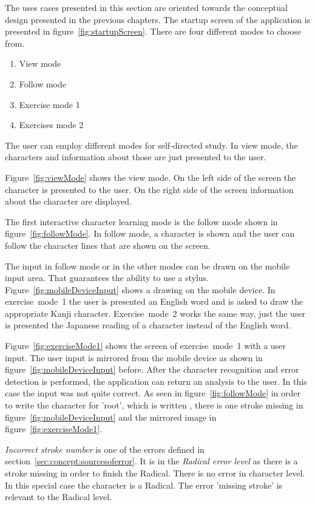 The uses cases presented in this section are oriented towards the conceptual
design presented in the previous chapters. The startup screen of the application
is presented in figure~\ref{fig:startupScreen}. There are four different modes 
to choose from.
\begin{enumerate}
\item View mode
\item Follow mode
\item Exercise mode 1
\item Exercises mode 2
\end{enumerate}
The user can employ different modes for self-directed study. In view mode,
the characters and information about those are just presented to the user.

Figure~\ref{fig:viewMode} shows the view mode. On the left side of the screen
the character is presented to the user. On the right side of the screen
information about the character are displayed.

The first interactive character learning mode is the follow mode shown in
figure~\ref{fig:followMode}. In follow mode, a character is shown and the user
can follow the character lines that are shown on the screen. 

The input in follow mode or in the other modes can be drawn on the mobile input
area. That guarantees the ability to use a stylus. 
Figure~\ref{fig:mobileDeviceInput} shows a drawing on the mobile device.
In exercise~mode~1 the user is presented an English word and is asked 
to draw the appropriate Kanji character. Exercise~mode~2 works the same way,
just the user is presented the Japanese reading of a character instead of the
English word.

Figure~\ref{fig:exerciseMode1} shows the screen of exercise~mode~1 with a
user input. The user input is mirrored from the mobile device as shown in 
figure~\ref{fig:mobileDeviceInput} before.
After the character recognition and error detection is performed,
the application can return an analysis to the user.
In this case the input was not quite correct. As seen in 
figure~\ref{fig:followMode} in order to write the character for 'root',
which is written , there is one stroke missing in 
figure~\ref{fig:mobileDeviceInput} and the mirrored image in
figure~\ref{fig:exerciseMode1}.

\emph{Incorrect stroke number} is one of the errors defined in 
section~\ref{sec:concept:sourcesoferror}. It is in the 
\emph{Radical error level} as there is a stroke missing in order to
finish the Radical.
There is no error in character level. In this special case the character
is a Radical. The error 'missing stroke' is relevant to the Radical level.

